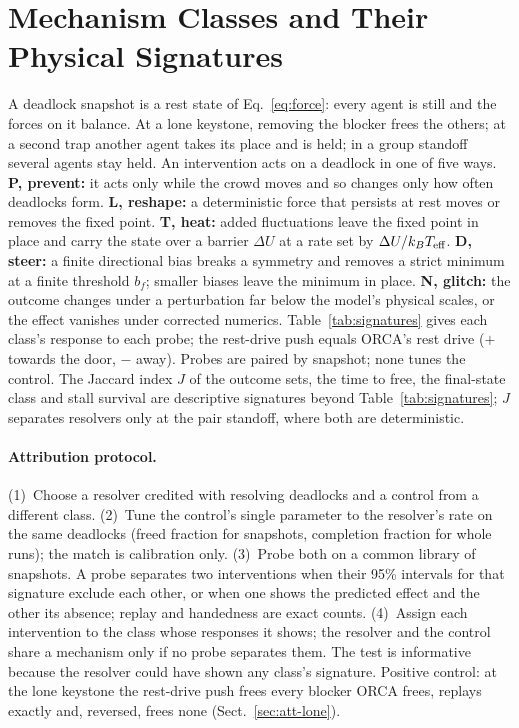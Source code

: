 \section{Mechanism Classes and Their Physical Signatures}\label{sec:signatures}

%
A deadlock snapshot is a rest state of Eq.~\eqref{eq:force}: every agent is still and the forces on it balance. At a lone keystone, removing the blocker frees the others; at a second trap another agent takes its place and is held; in a group standoff several agents stay held. An intervention acts on a deadlock in one of five ways. \textbf{P, prevent:} it acts only while the crowd moves and so changes only how often deadlocks form. \textbf{L, reshape:} a deterministic force that persists at rest moves or removes the fixed point. \textbf{T, heat:} added fluctuations leave the fixed point in place and carry the state over a barrier $\Delta U$ at a rate set by $\Delta U/k_BT_{\rm eff}$. \textbf{D, steer:} a finite directional bias breaks a symmetry and removes a strict minimum at a finite threshold $b_f$; smaller biases leave the minimum in place. \textbf{N, glitch:} the outcome changes under a perturbation far below the model's physical scales, or the effect vanishes under corrected numerics. Table~\ref{tab:signatures} gives each class's response to each probe; the rest-drive push equals ORCA's rest drive ($+$ towards the door, $-$ away). Probes are paired by snapshot; none tunes the control. The Jaccard index $J$ of the outcome sets, the time to free, the final-state class and stall survival are descriptive signatures beyond Table~\ref{tab:signatures}; $J$ separates resolvers only at the pair standoff, where both are deterministic.

\paragraph{Attribution protocol.}
(1)~Choose a resolver credited with resolving deadlocks and a control from a different class. (2)~Tune the control's single parameter to the resolver's rate on the same deadlocks (freed fraction for snapshots, completion fraction for whole runs); the match is calibration only. (3)~Probe both on a common library of snapshots. A probe separates two interventions when their 95\% intervals for that signature exclude each other, or when one shows the predicted effect and the other its absence; replay and handedness are exact counts. (4)~Assign each intervention to the class whose responses it shows; the resolver and the control share a mechanism only if no probe separates them. The test is informative because the resolver could have shown any class's signature. Positive control: at the lone keystone the rest-drive push frees every blocker ORCA frees, replays exactly and, reversed, frees none (Sect.~\ref{sec:att-lone}).

